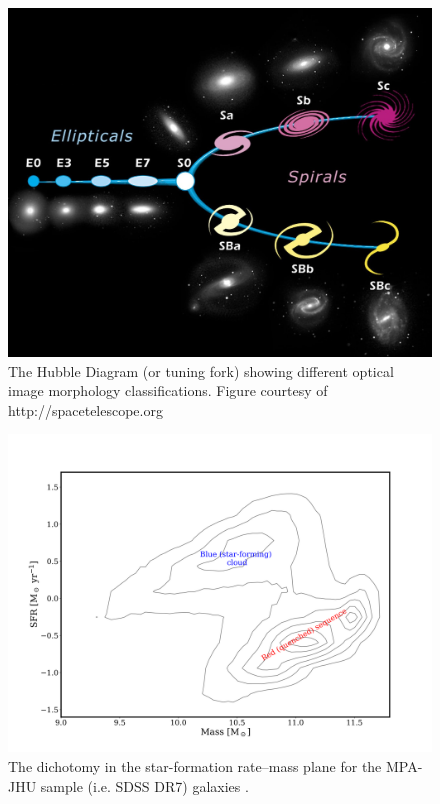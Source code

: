 \begin{figure}
	\centering
	\includegraphics[width=\textwidth]{introduction/hubble.jpg}
	\caption[The Hubble tuning-fork]{The Hubble Diagram (or tuning fork) showing different optical image morphology classifications. Figure courtesy of http://spacetelescope.org}
	\label{fig:Hubble}
\end{figure}

\begin{figure}
	\centering
	\includegraphics[width=\textwidth]{introduction/sfMass.png}
	\caption[Star-formation rate--Mass diagram]{The dichotomy in the star-formation rate--mass plane for the MPA-JHU sample (i.e. SDSS DR7) galaxies \citep{Kauffmann2003, Brinchmann2003, Salim2007}.}
	\label{fig:colorMass}
\end{figure}

